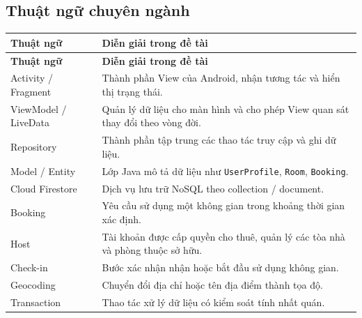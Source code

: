 \documentclass[12pt,a4paper]{article}
\numberwithin{figure}{subsection}
\numberwithin{table}{subsection}
\begin{document}
\subsection*{Thuật ngữ chuyên ngành}
\begin{longtable}{@{}p{4cm}p{10.2cm}@{}}\toprule
\textbf{Thuật ngữ}&\textbf{Diễn giải trong đề tài}\\\midrule\endfirsthead
\toprule\textbf{Thuật ngữ}&\textbf{Diễn giải trong đề tài}\\\midrule\endhead
Activity / Fragment& Thành phần View của Android, nhận tương tác và hiển thị trạng thái.\\
ViewModel / LiveData& Quản lý dữ liệu cho màn hình và cho phép View quan sát thay đổi theo vòng đời.\\
Repository& Thành phần tập trung các thao tác truy cập và ghi dữ liệu.\\
Model / Entity& Lớp Java mô tả dữ liệu như \texttt{UserProfile}, \texttt{Room}, \texttt{Booking}.\\
Cloud Firestore& Dịch vụ lưu trữ NoSQL theo collection / document.\\
Booking& Yêu cầu sử dụng một không gian trong khoảng thời gian xác định.\\
Host& Tài khoản được cấp quyền cho thuê, quản lý các tòa nhà và phòng thuộc sở hữu.\\
Check-in& Bước xác nhận nhận hoặc bắt đầu sử dụng không gian.\\
Geocoding& Chuyển đổi địa chỉ hoặc tên địa điểm thành tọa độ.\\
Transaction& Thao tác xử lý dữ liệu có kiểm soát tính nhất quán.\\\bottomrule\end{longtable}
\endgroup
\clearpage
\tableofcontents
\clearpage
{}\pagestyle{fancy}\setcounter{page}{1}







\clearpage
{}
\printbibliography[heading=bibintoc,title={TÀI LIỆU THAM KHẢO}]

\end{document}
